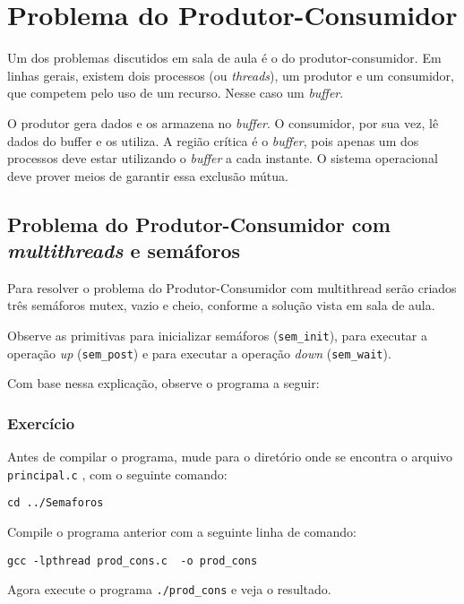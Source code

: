\chapter{Problema do Produtor-Consumidor}
Um dos problemas discutidos em sala de aula é o do produtor-consumidor. Em linhas gerais, existem dois processos (ou \textit{threads}), um produtor e um consumidor, que competem pelo uso de um recurso. Nesse caso um \textit{buffer}.

O produtor gera dados e os armazena no \textit{buffer}. O consumidor, por sua vez, lê dados do buffer e os utiliza. A região crítica é o \textit{buffer}, pois apenas um dos processos deve estar utilizando o \textit{buffer} a cada instante. O sistema operacional deve prover meios de garantir essa exclusão mútua.


\section{Problema do Produtor-Consumidor com \textit{multithreads} e semáforos}
Para resolver o problema do Produtor-Consumidor com multithread serão criados três semáforos mutex, vazio e cheio, conforme a solução vista em sala de aula.

Observe as primitivas para inicializar semáforos (\texttt{sem\_init}), para executar a operação \textit{up} (\texttt{sem\_post}) e para executar a operação \textit{down} (\texttt{sem\_wait}).

Com base nessa explicação, observe o programa a seguir: 


\subsection{Exercício}
Antes de compilar o programa, mude para o diretório onde se encontra o arquivo \texttt{principal.c} , com o seguinte comando:

\begin{lstlisting}[style=MyBashStyle]
cd ../Semaforos
\end{lstlisting}

Compile o programa anterior com a seguinte linha de comando:

\begin{lstlisting}[style=MyBashStyle]
gcc -lpthread prod_cons.c  -o prod_cons
\end{lstlisting}

Agora execute o programa \texttt{./prod\_cons} e veja o resultado.

